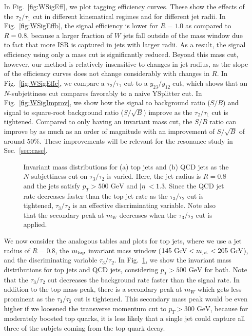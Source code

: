 \documentclass{JHEP3}
\newcommand{\vsh}{\vspace{-.5cm}}
\newcommand{\GeV}{\text{GeV}}
\DeclareRobustCommand{\Sec}[1]{Sec.~\ref{#1}}
\DeclareRobustCommand{\Fig}[1]{Fig.~\ref{#1}}
\begin{document}
In \Fig{fig:WSigEff}, we plot tagging efficiency curves.  These show the effects of the $\tau_2/\tau_1$ cut in different kinematical regimes and for different jet radii.   In \Fig{fig:WSigEffb}, the signal efficiency is lower for $R = 1.0$ as compared to $R = 0.8$, because a larger fraction of $W$ jets fall outside of the mass window due to fact that more ISR is captured in jets with larger radii.  As a result, the signal efficiency using only a mass cut is significantly reduced.  Beyond this mass cut, however, our method is relatively insensitive to changes in jet radius, as the slope of the efficiency curves does not change considerably with changes in $R$.  In \Fig{fig:WSigEffc}, we compare a $\tau_2/\tau_1$ cut to a $y_{23} / y_{12}$ cut, which shows that an $N$-subjettiness cut compares favorably to a naive YSplitter cut.  In \Fig{fig:WSigImprov}, we show how the signal to background ratio ($S/B$) and signal to square-root background ratio ($S/\sqrt{B}$) improve as the $\tau_2/\tau_1$ cut is tightened.  Compared to only having an invariant mass cut, the $S/B$ ratio can improve by as much as an order of magnitude with an improvement of $S/\sqrt{B}$ of around 50\%.  These improvements will be relevant for the resonance study in \Sec{sec:case}.

\begin{figure}[tp]
  \begin{center}
  \end{center}    
    \vsh
  \caption{Invariant mass distributions for (a) top jets and (b) QCD jets as the $N$-subjettiness cut on $\tau_3/\tau_2$ is varied.   Here, the jet radius is $R=0.8$ and the jets satisfy $p_T > 500 \text{ GeV}$ and $|\eta| < 1.3$.  Since the QCD jet rate decreases faster than the top jet rate as the $\tau_3/\tau_2$ cut is tightened, $\tau_3/\tau_2$ is an effective discriminating variable.  Note also that the secondary peak at $m_W$ decreases when the $\tau_3/\tau_2$ cut is applied.}
  \label{fig:TopInvM}
\end{figure}

We now consider the analogous tables and plots for top jets, where we use a jet radius of $R = 0.8$, the $m_{\rm top}$ invariant mass window ($145~\GeV < m_{\rm jet} < 205~\GeV$), and the discriminating variable $\tau_3/\tau_2$. In \Fig{fig:TopInvM}, we show the invariant mass distributions for top jets and QCD jets, considering $p_T > 500 \text{ GeV}$ for both.  Note that the $\tau_3/\tau_2$ cut decreases the background rate faster than the signal rate.  In addition to the top mass peak, there is a secondary peak at $m_W$ which gets less prominent as the $\tau_3/\tau_2$ cut is tightened.   This secondary mass peak would be even higher if we loosened the transverse momentum cut to $p_T > 300 \text{ GeV}$, because for moderately boosted top quarks, it is less likely that a single jet could capture all three of the subjets coming from the top quark decay.  
\end{document}

